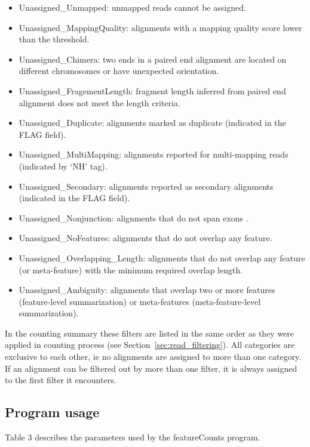 \documentclass[12pt]{report}
\newcommand{\featureCounts}{\textsf{featureCounts}}
\begin{document}
\begin{itemize}
\item Unassigned\_Unmapped: unmapped reads cannot be assigned.
\item Unassigned\_MappingQuality: alignments with a mapping quality score lower than the threshold.
\item Unassigned\_Chimera: two ends in a paired end alignment are located on different chromosomes or have unexpected orientation.
\item Unassigned\_FragementLength: fragment length inferred from paired end alignment does not meet the length criteria.
\item Unassigned\_Duplicate: alignments marked as duplicate (indicated in the FLAG field).
\item Unassigned\_MultiMapping: alignments reported for multi-mapping reads (indicated by `NH' tag).
\item Unassigned\_Secondary: alignments reported as secondary alignments (indicated in the FLAG field). 	
\item Unassigned\_Nonjunction: alignments that do not span exons .
\item Unassigned\_NoFeatures: alignments that do not overlap any feature.
\item Unassigned\_Overlapping\_Length: alignments that do not overlap any feature (or meta-feature) with the minimum required overlap length.
\item Unassigned\_Ambiguity: alignments that overlap two or more features (feature-level summarization) or meta-features (meta-feature-level summarization).
\end{itemize}

In the counting summary these filters are listed in the same order as they were applied in counting process (see Section~\ref{sec:read_filtering}).
All categories are exclusive to each other, ie no alignments are assigned to more than one category.
If an alignment can be filtered out by more than one filter, it is always assigned to the first filter it encounters. 


\subsection{Program usage}

Table 3 describes the parameters used by the {\featureCounts} program.

\pagebreak
\end{document}
